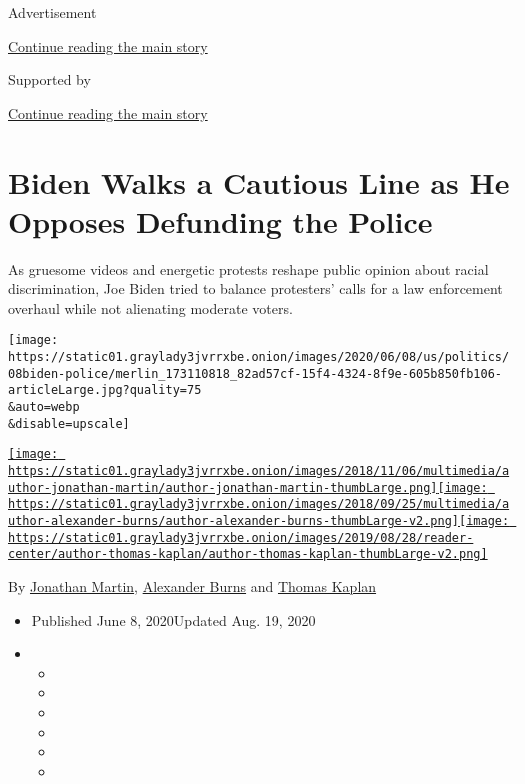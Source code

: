 Advertisement

\protect\hyperlink{after-top}{Continue reading the main story}

Supported by

\protect\hyperlink{after-sponsor}{Continue reading the main story}

\hypertarget{biden-walks-a-cautious-line-as-he-opposes-defunding-the-police}{%
\section{Biden Walks a Cautious Line as He Opposes Defunding the
Police}\label{biden-walks-a-cautious-line-as-he-opposes-defunding-the-police}}

As gruesome videos and energetic protests reshape public opinion about
racial discrimination, Joe Biden tried to balance protesters' calls for
a law enforcement overhaul while not alienating moderate voters.

\texttt{[image: https://static01.graylady3jvrrxbe.onion/images/2020/06/08/us/politics/08biden-police/merlin\_173110818\_82ad57cf-15f4-4324-8f9e-605b850fb106-articleLarge.jpg?quality=75\\\&auto=webp\\\&disable=upscale]}

\href{https://www.nytimes3xbfgragh.onion/by/jonathan-martin}{\texttt{[image: https://static01.graylady3jvrrxbe.onion/images/2018/11/06/multimedia/author-jonathan-martin/author-jonathan-martin-thumbLarge.png]}}\href{https://www.nytimes3xbfgragh.onion/by/alexander-burns}{\texttt{[image: https://static01.graylady3jvrrxbe.onion/images/2018/09/25/multimedia/author-alexander-burns/author-alexander-burns-thumbLarge-v2.png]}}\href{https://www.nytimes3xbfgragh.onion/by/thomas-kaplan}{\texttt{[image: https://static01.graylady3jvrrxbe.onion/images/2019/08/28/reader-center/author-thomas-kaplan/author-thomas-kaplan-thumbLarge-v2.png]}}

By \href{https://www.nytimes3xbfgragh.onion/by/jonathan-martin}{Jonathan
Martin},
\href{https://www.nytimes3xbfgragh.onion/by/alexander-burns}{Alexander
Burns} and
\href{https://www.nytimes3xbfgragh.onion/by/thomas-kaplan}{Thomas
Kaplan}

\begin{itemize}
\item
  Published June 8, 2020Updated Aug. 19, 2020
\item
  \begin{itemize}
  \item
  \item
  \item
  \item
  \item
  \item
  \end{itemize}
\end{itemize}

